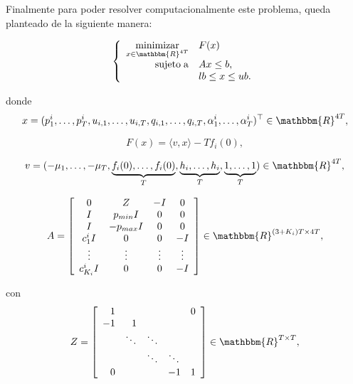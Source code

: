 \documentclass[a4paper,12pt]{report}
\newcommand{\la}{\langle}
\newcommand{\ra}{\rangle}
\newcommand{\RR}{\mathbbm{R}}
\newcommand{\om}{\omega}
\begin{document}
Finalmente para poder resolver computacionalmente este problema, queda planteado de la si\-guien\-te manera:

\begin{equation}\label{problematermo3}
\left\{
 \begin{array}{rl}
  \displaystyle\mathop{\mathrm{minimizar}}_{x\in\RR^{4T}}&F(x)\\
  \mathrm{sujeto\;a}& Ax\leq b,\\
  & lb\leq x\leq ub.
 \end{array}
\right.
\end{equation}



donde 
$$x=(p_1^i,\ldots,p_T^i,u_{i,1},\ldots,u_{i,T},q_{i,1},\ldots,q_{i,T},\alpha_1^i,\ldots,\alpha_T^i)^\top\in\RR^{4T},$$

$$F(x)=\la v, x\ra-Tf_i(0),$$

$$v=(-\mu_1,\ldots,-\mu_T,\underbrace{f_i(0),\ldots,f_i(0)}_{T},\underbrace{h_i,\ldots,h_i}_{T},\underbrace{1,\ldots,1}_{T})\in\RR^{4T},$$

$$A=\left[
\begin{array}{cccc}
0&Z&-I&0\\
I&p_{min} I&0&0\\
I&-p_{max} I&0&0\\
c^i_1 I&0&0&-I\\
\vdots&\vdots&\vdots&\vdots\\
c^i_{K_i} I&0&0&-I
\end{array}
\right]\in\RR^{(3+K_i)T\times 4T},$$

con 
$$Z=\left[
\begin{array}{rrllr}
 1 &  & &  & 0\\
  -1 & 1 &  & & \\
   &  \ddots & \ddots &    &\\
&&\ddots&\ddots&\\
0 &  &  & -1 & 1
\end{array}
\right]
\in\RR^{T\times T},$$
 
\end{document}
